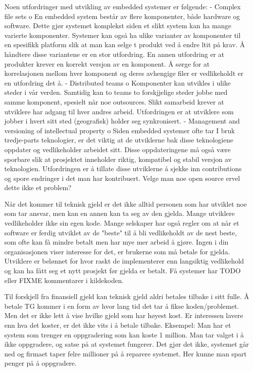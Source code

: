 Noen utfordringer med utvikling av embedded systemer er følgende:
-	Complex file sets
o	En embedded system består av flere komponenter, både hardware og software. Dette gjør systemet komplekst siden et slikt system kan ha mange varierte komponenter. Systemer kan også ha ulike varianter av komponenter til en spesifikk platform slik at man kan selge t produkt ved å endre ltit på krav. Å håndtere disse variantene er en stor utfordring. En annen utfordring er at produkter krever en korrekt versjon av en komponent. Å sørge for at korrelasjonen mellom hver komponent og deres avhengige filer er vedlikeholdt er en utfordring det å.
-	Distributed teams
o	Komponenter kan utvikles i ulike steder i vår verden. Samtidig kan to teams to forskjjelige steder jobbe med samme komponent, spesielt når noe outsources. Slikt samarbeid krever at utviklere har adgang til hver andres arbeid. Utfordringen er at utviklere som jobber i hvert sitt sted (geografisk) holder seg synkronisert.
-	Management and versioning of intellectual property
o	Siden embedded systemer ofte tar I bruk tredje-parts teknologier, er det viktig at de utviklerne bak disse teknologiene oppdater og vedlikeholder arbeidet sitt. Disse oppdateringene må også være sporbare slik at prosjektet inneholder riktig, kompatibel og stabil versjon av teknologien. Utfordringen er å tillate disse utviklerne å sjekke inn contributions og spore endringer i det man har kontribuert. Velge man noe open source ervel dette ikke et problem?




Når det kommer til teknisk gjeld er det ikke alltid personen som har utviklet noe som tar ansvar, men kan en annen kan ta seg av den gjelda. Mange utviklere vedlikeholder ikke sin egen kode. Mange selskaper har også regler om at når et software er ferdig utviklet av de "beste" til å bli vedlikeholdt av de nest beste, som ofte kan få mindre betalt men har mye mer arbeid å gjøre. Ingen i din organisasjonen viser interesse for det, er brukerne som må betale for gjelda. Utviklere er belønnet for hvor raskt de implementerer enn langsiktig vedlikehold og kan ha fått seg et nytt prosjekt før gjelda er betalt. Få systemer har TODO eller FIXME kommentarer i kildekoden. 

Til forskjell fra finansiell gjeld kan teknisk gjeld aldri betales tilbake i sitt fulle. Å betale TG kommer i en form av hvor lang tid det tar å fikse koden/problemet. Men det er ikke lett å vise hvilke gjeld som har høyest kost. Er interessen lavere enn hva det koster, er det ikke vits i å betale tilbake. Eksempel: Man har et system som trenger en oppgradering som kan koste 1 million. Man tar valget i å ikke oppgradere, og satse på at systemet fungerer. Det gjør det ikke, systemet går ned og firmaet taper felre millioner på å reparere systemet. Her kunne man spart penger på å oppgradere.


